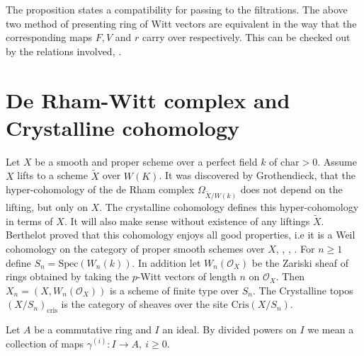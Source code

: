 \documentclass[12pt,twoside]{amsart}
\begin{document}
\vspace{0.5cm}

\noindent
The proposition states a compatibility for passing to the filtrations. The above two method of presenting ring of Witt vectors are equivalent in the way that the corresponding maps $F,V$ and $r$ carry over respectively. This can be checked out by the relations involved, \cite{BL}. 

\vspace{0.5cm}
 
\section{De Rham-Witt complex and Crystalline cohomology}

\vspace{0.5cm}

Let $X$ be a smooth and proper scheme over a perfect field $k$ of $\text{char}>0$. Assume $X$ lifts to a scheme $\tilde{X}$ over $W(K)$.  It was discovered by Grothendieck, that the hyper-cohomology of the de Rham complex $\Omega_{\tilde{X}/W(k)}$ does not depend on the lifting, but only on $X$. The crystalline cohomology defines this hyper-cohomology in terms of $X$. It will also make sense without existence of any liftings $\tilde{X}$. Berthelot proved that this cohomology enjoys all good properties, i.e it is a Weil cohomology on the category of proper smooth schemes over $X$, \cite{LZ}, \cite{BEO}, \cite{BL}. For $n \geq 1$ define $S_n=\text{Spec}(W_n(k))$. In addition let $W_n(\mathcal{O}_X)$ be the Zariski sheaf of rings obtained by taking the $p$-Witt vectors of length $n$ on $\mathcal{O}_X$. Then $X_n=(X,W_n(\mathcal{O}_X))$ is a scheme of finite type over $S_n$. The Crystalline topos $(X/S_n)_{\text{cris}}$ is the category of sheaves over the site $\text{Cris}(X/S_n)$. 

\vspace{0.5cm}

\noindent
Let $A$ be a commutative ring and $I$ an ideal. By divided powers on $I$ we mean a collection of maps $\gamma^{(i)}:I \to A, \ i \geq 0$. 

\vspace{0.5cm}
\end{document}
